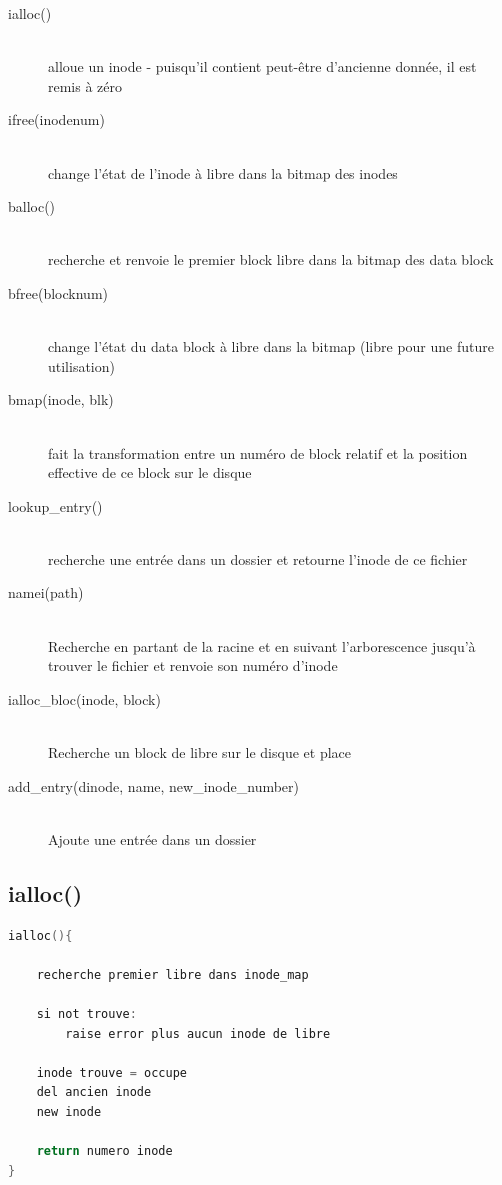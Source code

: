 \documentclass[a4paper,12pt]{article}
\begin{document}
\begin{description}
\item[ialloc()] \hfill \\
	alloue un inode - puisqu'il contient peut-être d'ancienne donnée, il est remis à zéro
\item[ifree(inodenum)] \hfill \\
	change l'état de l'inode à libre dans la bitmap des inodes
\item[balloc()] \hfill \\
	recherche et renvoie le premier block libre dans la bitmap des data block
\item[bfree(blocknum)] \hfill \\
	change l'état du data block à libre dans la bitmap (libre pour une future utilisation)
\item[bmap(inode, blk)] \hfill \\
	fait la transformation entre un numéro de block relatif et la position effective de ce block sur le disque
\item[lookup\_entry()] \hfill \\
	recherche une entrée dans un dossier et retourne l'inode de ce fichier
\item[namei(path)] \hfill \\
	Recherche en partant de la racine et en suivant l'arborescence jusqu'à trouver le fichier et renvoie son numéro d'inode
\item[ialloc\_bloc(inode, block)] \hfill \\
	Recherche un block de libre sur le disque et place 
\item[add\_entry(dinode, name, new\_inode\_number)] \hfill \\
	Ajoute une entrée dans un dossier
\end{description}


\subsection*{ialloc()}

\begin{lstlisting}[language=C, caption=pseudo code ialloc()()]
ialloc(){

	recherche premier libre dans inode_map
	
	si not trouve:
		raise error plus aucun inode de libre
	
	inode trouve = occupe
	del ancien inode
	new inode
	
	return numero inode
}
\end{lstlisting}
\end{document}
